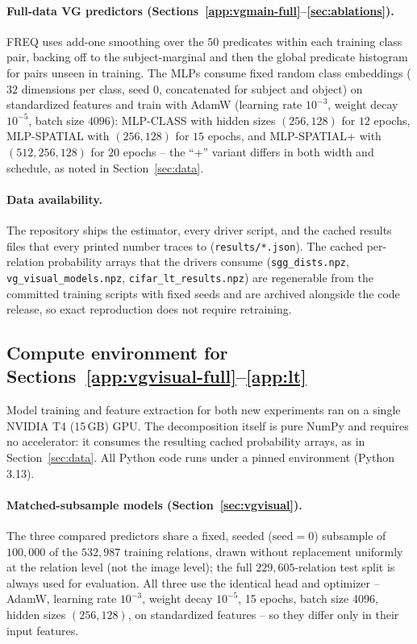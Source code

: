 \paragraph{Full-data VG predictors (Sections~\ref{app:vgmain-full}--\ref{sec:ablations}).}
FREQ uses add-one smoothing over the $50$ predicates within each training class pair,
backing off to the subject-marginal and then the global predicate histogram for pairs
unseen in training. The MLPs consume fixed random class embeddings
($32$ dimensions per class, seed $0$, concatenated for subject and object) on
standardized features and train with AdamW (learning rate $10^{-3}$, weight decay
$10^{-5}$, batch size $4096$): MLP-CLASS with hidden sizes $(256,128)$ for $12$ epochs,
MLP-SPATIAL with $(256,128)$ for $15$ epochs, and MLP-SPATIAL+ with $(512,256,128)$ for
$20$ epochs -- the ``+'' variant differs in both width and schedule, as noted in
Section~\ref{sec:data}.

\paragraph{Data availability.} The repository ships the estimator, every driver script,
and the cached results files that every printed number traces to
(\texttt{results/*.json}). The cached per-relation probability arrays that the drivers
consume (\texttt{sgg\_dists.npz}, \texttt{vg\_visual\_models.npz},
\texttt{cifar\_lt\_results.npz}) are regenerable from the committed training scripts
with fixed seeds and are archived alongside the code release, so exact reproduction
does not require retraining.

\subsection{Compute environment for Sections~\ref{app:vgvisual-full}--\ref{app:lt}}\label{app:compute}

Model training and feature extraction for both new experiments ran on a single NVIDIA
T4 (15\,GB) GPU. The decomposition itself is pure NumPy and requires no
accelerator: it consumes the resulting cached probability arrays, as in
Section~\ref{sec:data}. All Python code runs under a pinned environment (Python 3.13).

\paragraph{Matched-subsample models (Section~\ref{sec:vgvisual}).} The three compared
predictors share a fixed, seeded ($\text{seed}=0$) subsample of $100{,}000$ of the
$532{,}987$ training relations, drawn without replacement uniformly at the relation
level (not the image level); the full $229{,}605$-relation test split is always used for
evaluation. All three use the identical head and optimizer -- AdamW, learning rate
$10^{-3}$, weight decay $10^{-5}$, 15 epochs, batch size 4096, hidden sizes
$(256,128)$, on standardized features -- so they differ only in their input features.

